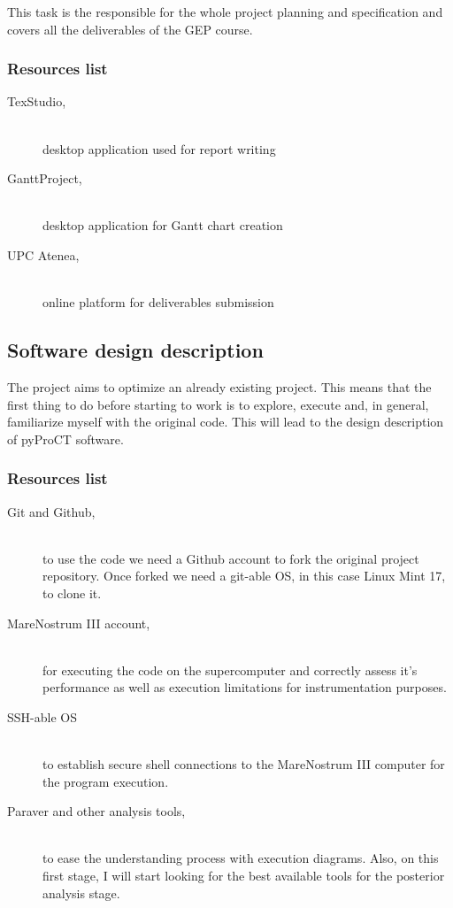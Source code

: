 This task is the responsible for the whole project planning and specification and covers all the deliverables of the GEP course.

\subsubsection{Resources list}

\begin{description}
\item [TexStudio,] \hfill \\ desktop application used for report writing
\item [GanttProject,] \hfill \\ desktop application for Gantt chart creation
\item [UPC Atenea,] \hfill \\ online platform for deliverables submission
\end{description}

\subsection{Software design description}

The project aims to optimize an already existing project. This means that the first thing to do before starting to work is to explore, execute and, in general, familiarize myself with the original code. This will lead to the design description of pyProCT software.

\subsubsection{Resources list}
\label{subsec:familiarresources}

\begin{description}
\item [Git and Github,] \hfill \\ to use the code we need a Github account to fork the original project repository. Once forked we need a git-able OS, in this case Linux Mint 17, to clone it.
\item [MareNostrum III account,] \hfill \\ for executing the code on the supercomputer and correctly assess it's performance as well as execution limitations for instrumentation purposes.
\item [SSH-able OS] \hfill \\ to establish secure shell connections to the MareNostrum III computer for the program execution.
\item [Paraver and other analysis tools,] \hfill \\ to ease the understanding process with execution diagrams. Also, on this first stage, I will start looking for the best available tools for the posterior analysis stage.

\end{description}

